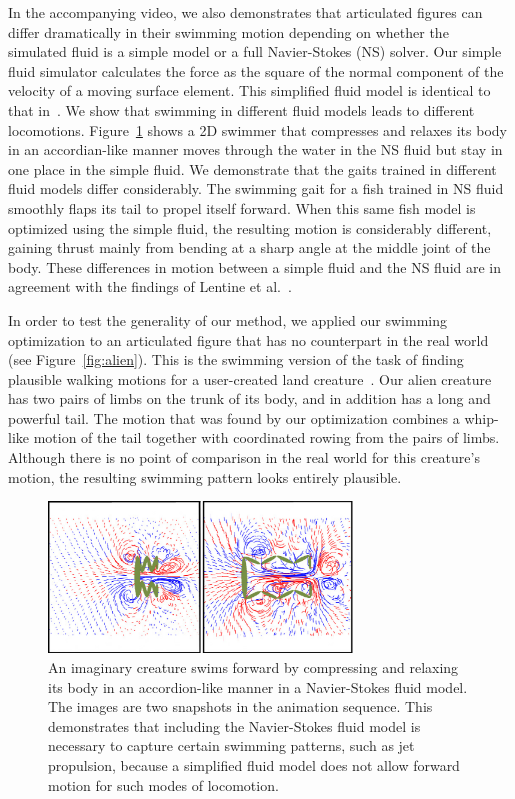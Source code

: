 In the accompanying video, we also demonstrates that articulated figures
can differ dramatically in their swimming motion depending on whether the
simulated fluid is a simple model or a full Navier-Stokes (NS) solver.
Our simple fluid simulator calculates the force as the square of the
normal component of the velocity of a moving surface element.  This
simplified fluid model is identical to that
in~\cite{wu2003realistic,lentine2010creature}.  We show that swimming in
different fluid models leads to different locomotions. Figure~\ref{fig:accordian} shows a 2D swimmer that
compresses and relaxes its body in an accordian-like manner moves through
the water in the NS fluid but stay in one place in the simple fluid. We
demonstrate that the gaits trained in different fluid models differ
considerably.  The swimming gait for a fish trained in NS fluid smoothly
flaps its tail to propel itself forward.  When this same fish model is
optimized using the simple fluid, the resulting motion is considerably
different, gaining thrust mainly from bending at a sharp angle at the
middle joint of the body.  These differences in motion between a simple
fluid and the NS fluid are in agreement with the findings of Lentine et
al.~\cite{lentine2010creature}.

In order to test the generality of our method, we applied our swimming
optimization to an articulated figure that has no counterpart in the real
world (see Figure~\ref{fig:alien}).  This is the swimming version of the task of finding plausible walking
motions for a user-created land
creature~\cite{hecker2008real,wampler2009optimal}.  Our alien creature has two
pairs of limbs on the trunk of its body, and in addition has a long and
powerful tail.  The motion that was found by our optimization combines a
whip-like motion of the tail together with coordinated rowing from the pairs of
limbs.  Although there is no point of comparison in the real world for this
creature's motion, the resulting swimming pattern looks entirely plausible.

\begin{figure}[!b]
\centering
\includegraphics[width=3.2in]{figures/accordian.eps}
\caption{An imaginary creature swims forward by compressing and relaxing its body in an accordion-like manner in a Navier-Stokes fluid model. The images are two snapshots in the animation sequence. This demonstrates that including the Navier-Stokes fluid model is necessary to capture certain swimming patterns, such as jet propulsion, because a simplified fluid model does not allow forward motion for such modes of locomotion.}
\label{fig:accordian}
\end{figure}

